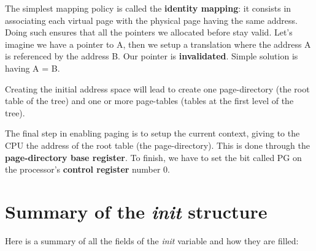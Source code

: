 The simplest mapping policy is called the \textbf{identity mapping}:
it consists in associating each virtual page with the physical page
having the same address. Doing such ensures that all the pointers we
allocated before stay valid. Let's imagine we have a pointer to A,
then we setup a translation where the address A is referenced by the
address B. Our pointer is \textbf{invalidated}. Simple solution is
having A = B.

Creating the initial address space will lead to create one
page-directory (the root table of the tree) and one or more
page-tables (tables at the first level of the tree).

The final step in enabling paging is to setup the current context,
giving to the CPU the address of the root table (the
page-directory). This is done through the \textbf{page-directory base
register}. To finish, we have to set the bit called PG on the
processor's \textbf{control register} number 0.

%
%

\section{Summary of the \textit{init} structure}

Here is a summary of all the fields of the \textit{init} variable and
how they are filled:


